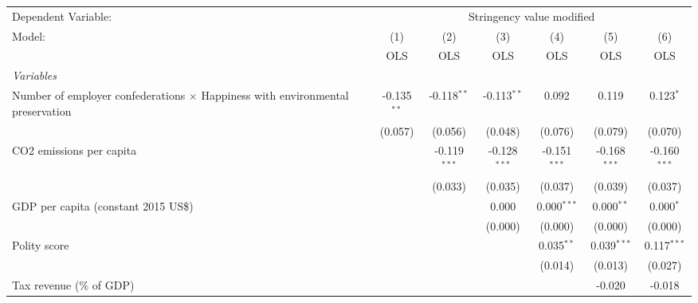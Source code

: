 
\begingroup
\centering
\begin{tabular}{lcccccc}
   \toprule
   Dependent Variable: & \multicolumn{6}{c}{Stringency value modified}\\
   Model:                                                                                & (1)           & (2)            & (3)            & (4)            & (5)            & (6)\\  
                                                                                         &  OLS          & OLS            & OLS            & OLS            & OLS            & OLS\\  
   \midrule
   \emph{Variables}\\
   Number of employer confederations $\times$ Happiness with environmental preservation  & -0.135$^{**}$ & -0.118$^{**}$  & -0.113$^{**}$  & 0.092          & 0.119          & 0.123$^{*}$\\   
                                                                                         & (0.057)       & (0.056)        & (0.048)        & (0.076)        & (0.079)        & (0.070)\\   
   CO2 emissions per capita                                                              &               & -0.119$^{***}$ & -0.128$^{***}$ & -0.151$^{***}$ & -0.168$^{***}$ & -0.160$^{***}$\\   
                                                                                         &               & (0.033)        & (0.035)        & (0.037)        & (0.039)        & (0.037)\\   
   GDP per capita (constant 2015 US\$)                                                   &               &                & 0.000          & 0.000$^{***}$  & 0.000$^{**}$   & 0.000$^{*}$\\   
                                                                                         &               &                & (0.000)        & (0.000)        & (0.000)        & (0.000)\\   
   Polity score                                                                          &               &                &                & 0.035$^{**}$   & 0.039$^{***}$  & 0.117$^{***}$\\   
                                                                                         &               &                &                & (0.014)        & (0.013)        & (0.027)\\   
   Tax revenue (\% of GDP)                                                               &               &                &                &                & -0.020         & -0.018\\   

\end{tabular}

